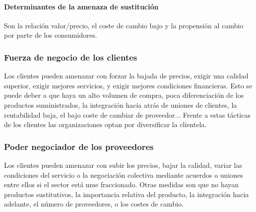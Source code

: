 \documentclass[12pt]{article}
\theoremstyle{definition_wo_parentheses}
\begin{document}
\paragraph{Determinantes de la amenaza de sustitución} Son la relación valor/precio, el coste de cambio bajo y la propensión al cambio por parte de los consumidores.

\subsubsection{Fuerza de negocio de los clientes}

Los clientes pueden amenazar con forzar la bajada de precios, exigir una calidad superior, exigir mejores servicios, y exigir mejores condiciones financieras. Esto se puede deber a que haya un alto volumen de compra, poca diferenciación de los productos suministrados, la integración hacia atrás de uniones de clientes, la rentabilidad baja, el bajo coste de cambiar de proveedor... Frente a estas tácticas de los clientes las organizaciones optan por diversificar la clientela.

\subsubsection{Poder negociador de los proveedores}

Los clientes pueden amenazar con subir los precios, bajar la calidad, variar las condiciones del servicio o la negociación colectiva mediante acuerdos o uniones entre ellos si el sector está mue fraccionado. Otras medidas son que no hayan productos sustitutivos, la importancia relativa del producto, la integración hacia adelante, el número de proveedores, o los costes de cambio.
\end{document}
